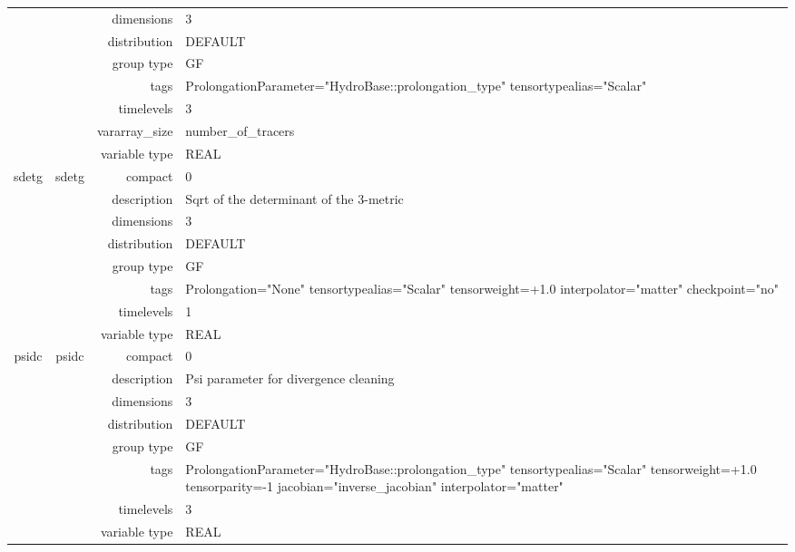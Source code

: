 \begin{tabular*}{150mm}{|c|c@{\extracolsep{\fill}}|rl|}
 &  & dimensions & 3 \\ 
 &  & distribution & DEFAULT \\ 
 &  & group type & GF \\ 
 &  & tags & ProlongationParameter="HydroBase::prolongation\_type" tensortypealias="Scalar" \\ 
 &  & timelevels & 3 \\ 
 &  & vararray\_size & number\_of\_tracers \\ 
 &  & variable type & REAL \\ 
\hline 
sdetg & sdetg & compact & 0 \\ 
 &  & description & Sqrt of the determinant of the 3-metric \\ 
 &  & dimensions & 3 \\ 
 &  & distribution & DEFAULT \\ 
 &  & group type & GF \\ 
 &  & tags & Prolongation="None" tensortypealias="Scalar" tensorweight=+1.0 interpolator="matter" checkpoint="no" \\ 
 &  & timelevels & 1 \\ 
 &  & variable type & REAL \\ 
\hline 
psidc & psidc & compact & 0 \\ 
 &  & description & Psi parameter for divergence cleaning \\ 
 &  & dimensions & 3 \\ 
 &  & distribution & DEFAULT \\ 
 &  & group type & GF \\ 
 &  & tags & ProlongationParameter="HydroBase::prolongation\_type" tensortypealias="Scalar" tensorweight=+1.0 tensorparity=-1 jacobian="inverse\_jacobian" interpolator="matter" \\ 
 &  & timelevels & 3 \\ 
 &  & variable type & REAL \\ 
\hline 
\end{tabular*} 



\vspace{5mm}
\vspace{5mm}

